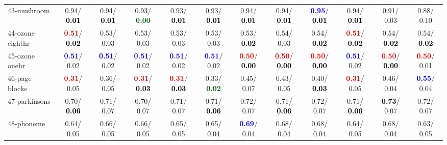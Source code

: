 \begin{table}[h]
\begin{center}
{\begin{tabular}{lc|c|c|c|c|c|c|c|c|c|c}
43-mushroom &   0.94/\textcolor{black}{\textbf{  0.01}} &   0.94/\textcolor{black}{\textbf{  0.01}} &   0.93/\textcolor{darkgreen}{\textbf{  0.00}} &   0.93/\textcolor{black}{\textbf{  0.01}} &   0.93/\textcolor{black}{\textbf{  0.01}} &   0.94/\textcolor{black}{\textbf{  0.01}} &   0.94/\textcolor{black}{\textbf{  0.01}} & \textcolor{blue}{\textbf{  0.95}}/\textcolor{black}{\textbf{  0.01}} &   0.94/\textcolor{black}{\textbf{  0.01}} &   0.91/  0.03 &   0.88/  0.10 \\
44-ozone eighthr & \textcolor{red}{\textbf{  0.51}}/\textcolor{black}{\textbf{  0.02}} &   0.53/  0.03 &   0.53/  0.03 &   0.53/  0.03 &   0.53/  0.03 &   0.53/\textcolor{black}{\textbf{  0.02}} &   0.54/  0.03 &   0.54/\textcolor{black}{\textbf{  0.02}} & \textcolor{red}{\textbf{  0.51}}/\textcolor{black}{\textbf{  0.02}} &   0.54/\textcolor{black}{\textbf{  0.02}} &   0.54/\textcolor{black}{\textbf{  0.02}} \\
45-ozone onehr & \textcolor{blue}{\textbf{  0.51}}/  0.02 & \textcolor{blue}{\textbf{  0.51}}/  0.02 & \textcolor{blue}{\textbf{  0.51}}/  0.02 & \textcolor{blue}{\textbf{  0.51}}/  0.02 & \textcolor{blue}{\textbf{  0.51}}/  0.02 & \textcolor{red}{\textbf{  0.50}}/\textcolor{black}{\textbf{  0.00}} & \textcolor{red}{\textbf{  0.50}}/\textcolor{black}{\textbf{  0.00}} & \textcolor{red}{\textbf{  0.50}}/\textcolor{black}{\textbf{  0.00}} & \textcolor{blue}{\textbf{  0.51}}/  0.02 & \textcolor{red}{\textbf{  0.50}}/\textcolor{black}{\textbf{  0.00}} & \textcolor{red}{\textbf{  0.50}}/  0.01 \\
46-page blocks & \textcolor{red}{\textbf{  0.31}}/  0.05 &   0.36/  0.05 & \textcolor{red}{\textbf{  0.31}}/\textcolor{black}{\textbf{  0.03}} & \textcolor{red}{\textbf{  0.31}}/\textcolor{black}{\textbf{  0.03}} &   0.33/\textcolor{darkgreen}{\textbf{  0.02}} &   0.45/  0.07 &   0.43/  0.05 &   0.40/\textcolor{black}{\textbf{  0.03}} & \textcolor{red}{\textbf{  0.31}}/  0.05 &   0.46/  0.04 & \textcolor{blue}{\textbf{  0.55}}/  0.04 \\ \hline
47-parkinsons &   0.70/\textcolor{black}{\textbf{  0.06}} &   0.71/  0.07 &   0.70/  0.07 &   0.71/  0.07 &   0.71/\textcolor{black}{\textbf{  0.06}} &   0.72/  0.07 &   0.71/\textcolor{black}{\textbf{  0.06}} &   0.72/  0.07 &   0.71/\textcolor{black}{\textbf{  0.06}} & \textcolor{black}{\textbf{  0.73}}/  0.07 &   0.72/  0.07 \\
48-phoneme &   0.64/  0.05 &   0.66/  0.05 &   0.66/  0.05 &   0.65/  0.05 &   0.65/  0.04 & \textcolor{blue}{\textbf{  0.69}}/  0.04 &   0.68/  0.04 &   0.68/  0.04 &   0.64/  0.05 &   0.68/  0.04 &   0.63/  0.05 \\

\end{tabular}}
\end{center}
\end{table}
